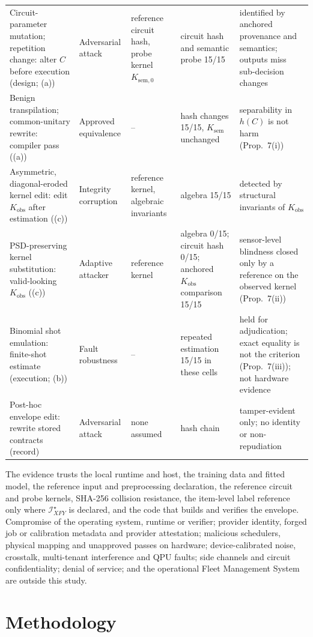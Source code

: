 \documentclass[10pt,journal,compsoc]{IEEEtran}
\newcommand{\IXFYs}{\mathcal I_{XFY}^{\star}}
\begin{document}
\begin{table}[!t]
\begin{tabularx}{\textwidth}{@{}p{}p{}YYp{0.235\textwidth}@{}}
Circuit-parameter mutation; repetition change: alter $C$ before execution (design; (a)) & Adversarial attack & reference circuit hash, probe kernel $K_{\mathrm{sem},0}$ & circuit hash and semantic probe 15/15 & identified by anchored provenance and semantics; outputs miss sub-decision changes \\
Benign transpilation; common-unitary rewrite: compiler pass ((a)) & Approved equivalence & -- & hash changes 15/15, $K_{\mathrm{sem}}$ unchanged & separability in $h(C)$ is not harm (Prop.~7(i)) \\
Asymmetric, diagonal-eroded kernel edit: edit $K_{\mathrm{obs}}$ after estimation ((c)) & Integrity corruption & reference kernel, algebraic invariants & algebra 15/15 & detected by structural invariants of $K_{\mathrm{obs}}$ \\
PSD-preserving kernel substitution: valid-looking $K_{\mathrm{obs}}$ ((c)) & Adaptive attacker & reference kernel & algebra 0/15; circuit hash 0/15; anchored $K_{\mathrm{obs}}$ comparison 15/15 & sensor-level blindness closed only by a reference on the observed kernel (Prop.~7(ii)) \\
Binomial shot emulation: finite-shot estimate (execution; (b)) & Fault robustness & -- & repeated estimation 15/15 in these cells & held for adjudication; exact equality is not the criterion (Prop.~7(iii)); not hardware evidence \\
Post-hoc envelope edit: rewrite stored contracts (record) & Adversarial attack & none assumed & hash chain & tamper-evident only; no identity or non-repudiation \\
\bottomrule
\end{tabularx}
\end{table}

The evidence trusts the local runtime and host, the training data and fitted
model, the reference input and preprocessing declaration, the reference
circuit and probe kernels, SHA-256 collision resistance, the item-level label
reference only where $\IXFYs$ is declared, and the code that builds and
verifies the envelope. Compromise of the operating system, runtime or
verifier; provider identity, forged job or calibration metadata and provider
attestation; malicious schedulers, physical mapping and unapproved passes on
hardware; device-calibrated noise, crosstalk, multi-tenant interference and
QPU faults; side channels and circuit confidentiality; denial of service; and
the operational Fleet Management System are outside this study.

\section{Methodology}
\end{document}
